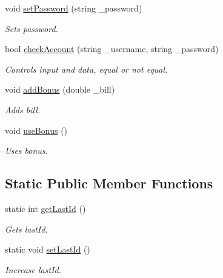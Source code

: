 \begin{DoxyCompactItemize}
void \hyperlink{classCustomer_a87953a93ed8a81f9835d26d2ecf3742a}{set\+Password} (string \+\_\+password)
\begin{DoxyCompactList}\small\item\em Sets password. \end{DoxyCompactList}\item 
bool \hyperlink{classCustomer_ae1e9fb03ed6179ecbcd6c0212bc7de17}{check\+Account} (string \+\_\+username, string \+\_\+password)
\begin{DoxyCompactList}\small\item\em Controls input and data, equal or not equal. \end{DoxyCompactList}\item 
void \hyperlink{classCustomer_a6bd365c7ee7c4807de7e0fb94b4a9687}{add\+Bonus} (double \+\_\+bill)
\begin{DoxyCompactList}\small\item\em Adds bill. \end{DoxyCompactList}\item 
void \hyperlink{classCustomer_ab5a0e54395ef83bef1f51a3a98b30ec4}{use\+Bonus} ()
\begin{DoxyCompactList}\small\item\em Uses bonus. \end{DoxyCompactList}\end{DoxyCompactItemize}
\subsection*{Static Public Member Functions}
\begin{DoxyCompactItemize}
\item 
static int \hyperlink{classCustomer_a8bbc27f996653fc209aef876146a2667}{get\+Last\+Id} ()
\begin{DoxyCompactList}\small\item\em Gets last\+Id. \end{DoxyCompactList}\item 
static void \hyperlink{classCustomer_aaece4550faac5834bc9d7e4158eb1498}{set\+Last\+Id} ()\hypertarget{classCustomer_aaece4550faac5834bc9d7e4158eb1498}{}\label{classCustomer_aaece4550faac5834bc9d7e4158eb1498}

\begin{DoxyCompactList}\small\item\em Increase last\+Id. \end{DoxyCompactList}\end{DoxyCompactItemize}


